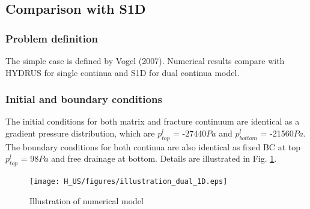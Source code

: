 \subsection{Comparison with S1D}
\label{dual-1}
\subsubsection*{Problem definition}
The simple case is defined by Vogel (2007)\cite{vogel:2007}.
Numerical results compare with HYDRUS for single continua and S1D
for dual continua model.
%
\subsubsection*{Initial and boundary conditions}
The initial conditions for both matrix and fracture continuum are
identical as a gradient pressure distribution, which are
$p^l_{top}$ = -27440$Pa$ and $p^l_{bottom}$ = -21560$Pa$. The
boundary conditions for both continua are also identical as fixed
BC at top $p^l_{top}$ = 98$Pa$ and free drainage at bottom.
Details are illustrated in Fig. \ref{us:dual-1d}.
\begin{figure} [h]
 \centering
 \texttt{[image: H\_US/figures/illustration\_dual\_1D.eps]}
 \caption{Illustration of numerical model}
 \label{us:dual-1d}
\end{figure}
